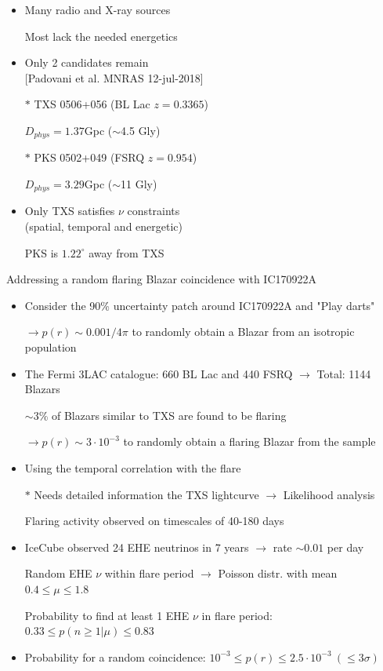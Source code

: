 \newpage

\begin{itemize}
\item Many radio and X-ray sources 
\item[] Most lack the needed energetics
\item Only 2 candidates remain\\
      {\large [Padovani et al. MNRAS 12-jul-2018]}
\item[$\ast$] TXS 0506+056 (BL Lac $z=0.3365$)
\item[] $D_{phys}=1.37$Gpc ($\sim$4.5 Gly)
\item[$\ast$] PKS 0502+049 (FSRQ $z=0.954$)
\item[] $D_{phys}=3.29$Gpc ($\sim$11 Gly)
\item Only TXS satisfies $\nu$ constraints\\
      (spatial, temporal and energetic)
\item[] PKS is $1.22^{\circ}$ away from TXS
\end{itemize}

\Tr
\onecolumn
\begin{center}
{\blue Addressing a random flaring Blazar coincidence with IC170922A}
\end{center}
%
\begin{itemize}
\item Consider the 90\% uncertainty patch around IC170922A and "Play darts"
\item[] $\rightarrow p(r) \sim 0.001/4\pi$ to randomly obtain a Blazar from an isotropic population
\item The Fermi 3LAC catalogue: 660 BL Lac and 440 FSRQ $\rightarrow$ Total: 1144 Blazars
\item[] $\sim 3$\% of Blazars similar to TXS are found to be flaring 
\item[] $\rightarrow p(r) \sim 3 \cdot 10^{-3}$ to randomly obtain a flaring Blazar from the sample
\item Using the temporal correlation with the flare
\item[$\ast$] Needs detailed information the TXS lightcurve $\rightarrow$ Likelihood analysis
\item[] Flaring activity observed on timescales of 40-180 days
\item IceCube observed 24 EHE neutrinos in 7 years $\rightarrow$ rate $\sim 0.01$ per day
\item[] Random EHE $\nu$ within flare period $\rightarrow$ Poisson distr. with mean $0.4 \le \mu \le 1.8$
\item[] Probability to find at least 1 EHE $\nu$ in flare period: $0.33 \le p(n \ge 1|\mu) \le 0.83$
\item Probability for a random coincidence: $10^{-3} \le p(r) \le 2.5 \cdot 10^{-3}~(\le 3\sigma)$
\end{itemize}

